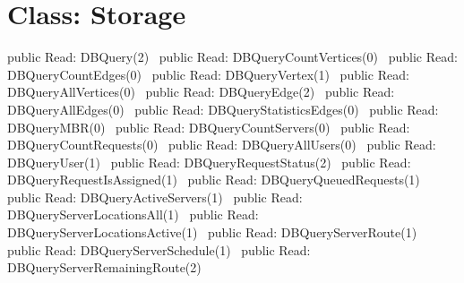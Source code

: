 \section*{Class: Storage}
\nwenddocs{}\endmoddef{}
public \LA{}Read: DBQuery(2)~{\nwtagstyle{}}\RA{}
public \LA{}Read: DBQueryCountVertices(0)~{\nwtagstyle{}}\RA{}
public \LA{}Read: DBQueryCountEdges(0)~{\nwtagstyle{}}\RA{}
public \LA{}Read: DBQueryVertex(1)~{\nwtagstyle{}}\RA{}
public \LA{}Read: DBQueryAllVertices(0)~{\nwtagstyle{}}\RA{}
public \LA{}Read: DBQueryEdge(2)~{\nwtagstyle{}}\RA{}
public \LA{}Read: DBQueryAllEdges(0)~{\nwtagstyle{}}\RA{}
public \LA{}Read: DBQueryStatisticsEdges(0)~{\nwtagstyle{}}\RA{}
public \LA{}Read: DBQueryMBR(0)~{\nwtagstyle{}}\RA{}
public \LA{}Read: DBQueryCountServers(0)~{\nwtagstyle{}}\RA{}
public \LA{}Read: DBQueryCountRequests(0)~{\nwtagstyle{}}\RA{}
public \LA{}Read: DBQueryAllUsers(0)~{\nwtagstyle{}}\RA{}
public \LA{}Read: DBQueryUser(1)~{\nwtagstyle{}}\RA{}
public \LA{}Read: DBQueryRequestStatus(2)~{\nwtagstyle{}}\RA{}
public \LA{}Read: DBQueryRequestIsAssigned(1)~{\nwtagstyle{}}\RA{}
public \LA{}Read: DBQueryQueuedRequests(1)~{\nwtagstyle{}}\RA{}
public \LA{}Read: DBQueryActiveServers(1)~{\nwtagstyle{}}\RA{}
public \LA{}Read: DBQueryServerLocationsAll(1)~{\nwtagstyle{}}\RA{}
public \LA{}Read: DBQueryServerLocationsActive(1)~{\nwtagstyle{}}\RA{}
public \LA{}Read: DBQueryServerRoute(1)~{\nwtagstyle{}}\RA{}
public \LA{}Read: DBQueryServerSchedule(1)~{\nwtagstyle{}}\RA{}
public \LA{}Read: DBQueryServerRemainingRoute(2)~{\nwtagstyle{}}\RA{}
